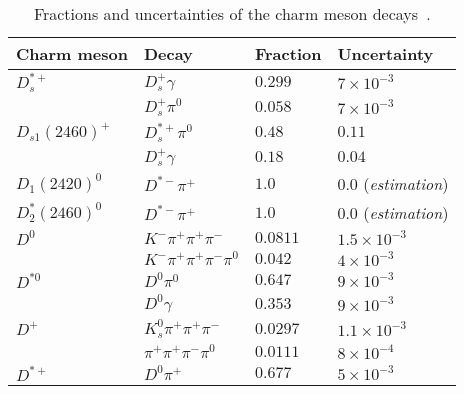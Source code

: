{
\renewcommand{\arraystretch}{1.25}
 \begin{table}
\centering
\scriptsize
\begin{tabular}{l | l | l | l }
Charm meson & Decay & Fraction & Uncertainty \\
\hline

$D_{s}^{*+}$ & $D_{s}^{+} \gamma$  &  $0.299$ & $7\times 10^{-3}$ \\
  & $D_{s}^{+} \pi^{0}$ & $0.058$ & $7\times 10^{-3}$ \\ \hline
$D_{s 1}(2460)^{+}$ & $D_{s}^{*+} \pi^{0}$  &  $0.48$ & $0.11$ \\
  & $D_{s}^{+} \gamma$ & $0.18$ & $0.04$ \\ \hline

$D_{1}(2420)^{0}$ & $ D^{*-} \pi^{+}$  &  $1.0$ & $0.0$ (\textit{estimation}) \\ \hline  %
$D_{2}^{*}(2460)^{0}$ & $D^{*-} \pi^{+}$  &  $1.0$ & $0.0$ (\textit{estimation}) \\ \hline  %
$D^{0}$ & $K^{-} \pi^{+} \pi^{+} \pi^{-}$  &  $0.0811$ & $1.5\times 10^{-3}$  \\
 & $K^{-} \pi^{+} \pi^{+} \pi^{-} \pi^{0}$  &  $0.042$ & $4\times 10^{-3}$  \\\hline  

$D^{*0}$ & $D^{0} \pi^{0}$  &  $0.647$ & $9\times 10^{-3}$  \\
 & $D^{0} \gamma$  &  $0.353$ & $9\times 10^{-3}$  \\\hline  

$D^{+}$ & $K_{s}^{0} \pi^{+} \pi^{+} \pi^{-}$  &  $0.0297$ & $1.1\times 10^{-3}$  \\
 & $\pi^{+} \pi^{+} \pi^{-} \pi^{0}$  &  $0.0111$ & $8\times 10^{-4}$  \\\hline  

$D^{*+}$ & $D^{0} \pi^{+}$  &  $0.677$ & $5\times 10^{-3}$  \\



\end{tabular}
\caption{Fractions and uncertainties of the charm meson decays~\cite{PhysRevD.98.030001}.}
\label{tab:Ds_bkg_modes}
\end{table}
    }    
    
    







